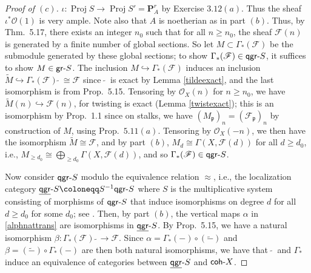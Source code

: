 \documentclass[10pt]{article}
\theoremstyle{definition}
\theoremstyle{remark}
\numberwithin{equation}{section}
\numberwithin{figure}{subsubsection}
\DeclareMathOperator{\Proj}{Proj}
\newcommand{\FF}{\mathscr{F}}
\newcommand{\OO}{\mathcal{O}}
\newcommand{\gr}{\mathsf{gr}\mathchar`-}
\newcommand{\qgr}{\mathsf{qgr}\mathchar`-}
\newcommand{\uqgr}{\underline{\mathsf{qgr}}\mathchar`-}
\newcommand{\coh}{\mathsf{coh}\mathchar`-}
\begin{document}
\begin{proof}[Proof of $(c)$]
  $\iota\colon\Proj S \to \Proj S' = \mathbf{P}^r_A$ by Exercise $3.12(a)$. Thus the sheaf $\iota^*\OO(1)$ is very ample. Note also that $A$ is noetherian as in part $(b)$. Thus, by Thm.~5.17, there exists an integer $n_0$ such that for all $n \ge n_0$, the sheaf $\FF(n)$ is generated by a finite number of global sections. So let $M \subset \Gamma_*(\FF)$ be the submodule generated by these global sections; to show $\Gamma_*(\FF) \in \qgr S$, it suffices to show $M \in \gr S$. The inclusion $M \hookrightarrow \Gamma_*(\FF)$ induces an inclusion $\tilde{M} \hookrightarrow \Gamma_*(\FF)\:\tilde{}\: \cong \FF$ since $\:\tilde{}\:$ is exact by Lemma \ref{tildeexact}, and the last isomorphism is from Prop.~5.15. Tensoring by $\OO_X(n)$ for $n \ge n_0$, we have $\tilde{M}(n) \hookrightarrow \FF(n)$, for twisting is exact (Lemma \ref{twistexact}); this is an isomorphism by Prop.~1.1 since on stalks, we have $(M_\mathfrak{p})_n = (\FF_\mathfrak{p})_n$ by construction of $M$, using Prop.~$5.11(a)$. Tensoring by $\OO_X(-n)$, we then have the isomorphism $\tilde{M} \cong \FF$, and by part $(b)$, $M_d \cong \Gamma(X,\FF(d))$ for all $d \ge d_0$, i.e., $M_{\ge d_0} \cong \bigoplus_{\ge d_0} \Gamma(X,\FF(d))$, and so $\Gamma_*(\FF) \in \qgr S$.
  \par Now consider $\qgr S$ modulo the equivalence relation $\approx$, i.e., the localization category $\uqgr S \coloneqq S^{-1}\qgr S$ where $S$ is the multiplicative system consisting of morphisms of $\qgr S$ that induce isomorphisms on degree $d$ for all $d \ge d_0$ for some $d_0$; see \cite[\S10.3, spec.~Exc.~10.3.2]{Wei94}. Then, by part $(b)$, the vertical maps $\alpha$ in \eqref{alphnattrans} are isomorphisms in $\uqgr S$. By Prop.~5.15, we have a natural isomorphism $\beta\colon \Gamma_*(\FF)\:\tilde\: \to \FF$. Since $\alpha = \Gamma_*(-) \circ (\tilde{-})$ and $\beta = (\tilde{-}) \circ \Gamma_*(-)$ are then both natural isomorphisms, we have that $\:\tilde{}\:$ and $\Gamma_*$ induce an equivalence of categories between $\uqgr S$ and $\coh X$.
\end{proof}
\end{document}
